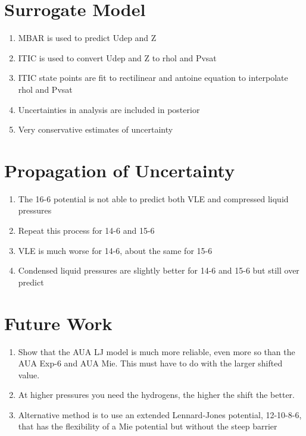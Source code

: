 \documentclass[preprint,letterpaper,floatfix,citeautoscript,aip,jcp]{revtex4-1}
\begin{document}
\section{Surrogate Model}

\begin{enumerate}
	\item MBAR is used to predict Udep and Z
	\item ITIC is used to convert Udep and Z to rhol and Pvsat
	\item ITIC state points are fit to rectilinear and antoine equation to interpolate rhol and Pvsat
	\item Uncertainties in analysis are included in posterior
	\item Very conservative estimates of uncertainty
\end{enumerate}

\section{Propagation of Uncertainty}

\begin{enumerate}
	\item The 16-6 potential is not able to predict both VLE and compressed liquid pressures
	\item Repeat this process for 14-6 and 15-6
	\item VLE is much worse for 14-6, about the same for 15-6
	\item Condensed liquid pressures are slightly better for 14-6 and 15-6 but still over predict
\end{enumerate}

\section{Future Work}

\begin{enumerate}
	\item Show that the AUA LJ model is much more reliable, even more so than the AUA Exp-6 and AUA Mie. This must have to do with the larger shifted value.
	\item At higher pressures you need the hydrogens, the higher the shift the better.
	\item Alternative method is to use an extended Lennard-Jones potential, 12-10-8-6, that has the flexibility of a Mie potential but without the steep barrier
\end{enumerate}
 
\end{document}
